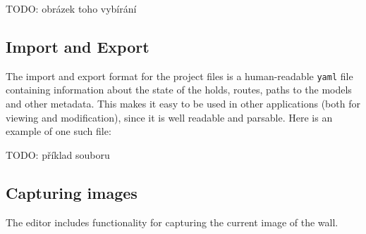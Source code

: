 TODO: obrázek toho vybírání


\subsection{Import and Export}
The import and export format for the project files is a human-readable \verb|yaml| file containing information about the state of the holds, routes, paths to the models and other metadata.
This makes it easy to be used in other applications (both for viewing and modification), since it is well readable and parsable.
Here is an example of one such file:

TODO: příklad souboru

\subsection{Capturing images}
The editor includes functionality for capturing the current image of the wall.
